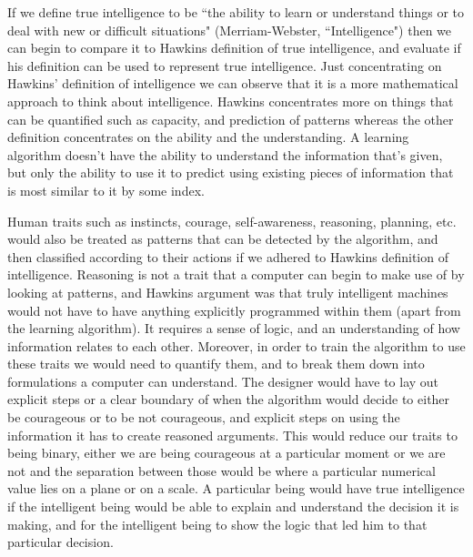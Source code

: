 \documentclass[11pt, oneside]{article}
\begin{document}

\par 
If we define true intelligence to be ``the ability to learn or understand things or to deal with new or difficult situations" (Merriam-Webster, ``Intelligence") then we can begin to compare it to Hawkins definition of true intelligence, and evaluate if his definition can be used to represent true intelligence. Just concentrating on Hawkins' definition of intelligence we can observe that it is a more mathematical approach to think about intelligence. 
Hawkins concentrates more on things that can be quantified such as capacity, and prediction of patterns whereas the other definition concentrates on the ability and the understanding. 
A learning algorithm doesn't have the ability to understand the information that's given, but only the ability to use it to predict using existing pieces of information that is most similar to it by some index. 

\par 
Human traits such as instincts, courage, self-awareness, reasoning, planning, etc. would also be treated as patterns that can be detected by the algorithm, and then classified according to their actions if we adhered to Hawkins definition of intelligence. Reasoning is not a trait that a computer can begin to make use of by looking at patterns, and Hawkins argument was that truly intelligent machines would not have to have anything explicitly programmed within them (apart from the learning algorithm). It requires a sense of logic, and an understanding of how information relates to each other. Moreover, in order to train the algorithm to use these traits we would need to quantify them, and to break them down into formulations a computer can understand. The designer would have to lay out explicit steps or a clear boundary of when the algorithm would decide to either be courageous or to be not courageous, and explicit steps on using the information it has to create reasoned arguments. This would reduce our traits to being binary, either we are being courageous at a particular moment or we are not and the separation between those would be where a particular numerical value lies on a plane or on a scale. 
A particular being would have true intelligence if the intelligent being would be able to explain and understand the decision it is making, and for the intelligent being to show the logic that led him to that particular decision. 
\end{document}
